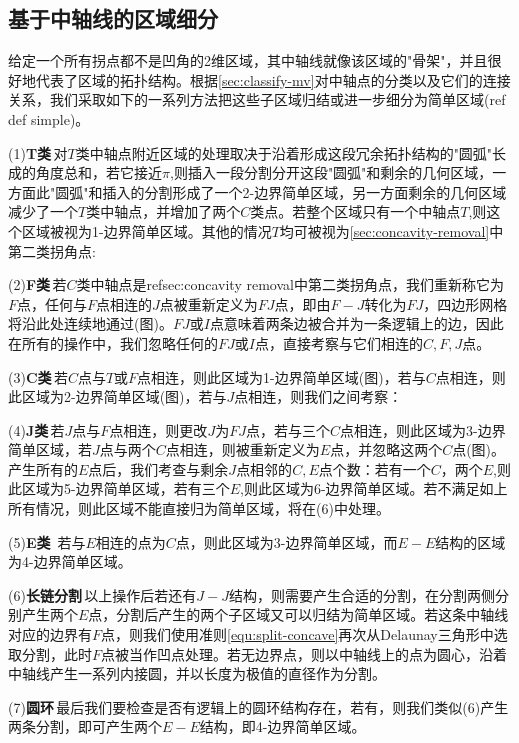 \subsection{基于中轴线的区域细分}\label{ma-prime}
给定一个所有拐点都不是凹角的2维区域，其中轴线就像该区域的"骨架"，并且很好地代表了区域的拓扑结构。根据\ref{sec:classify-mv}对中轴点的分类以及它们的连接关系，我们采取如下的一系列方法把这些子区域归结或进一步细分为简单区域(ref def simple)。

(1)\textbf{T类}\,对$T$类中轴点附近区域的处理取决于沿着形成这段冗余拓扑结构的"圆弧"长成的角度总和，若它接近$\pi$,则插入一段分割分开这段"圆弧"和剩余的几何区域，一方面此"圆弧"和插入的分割形成了一个2-边界简单区域，另一方面剩余的几何区域减少了一个$T$类中轴点，并增加了两个$C$类点。若整个区域只有一个中轴点$T$,则这个区域被视为1-边界简单区域。其他的情况$T$均可被视为\ref{sec:concavity-removal}中第二类拐角点:

(2)\textbf{F类}\,若$C$类中轴点是ref{sec:concavity removal}中第二类拐角点，我们重新称它为$F$点，任何与$F$点相连的$J$点被重新定义为$FJ$点，即由$F-J$转化为$FJ$，四边形网格将沿此处连续地通过(图)。$FJ$或$I$点意味着两条边被合并为一条逻辑上的边，因此在所有的操作中，我们忽略任何的$FJ$或$I$点，直接考察与它们相连的$C,F,J$点。

(3)\textbf{C类}\,若$C$点与$T$或$F$点相连，则此区域为1-边界简单区域(图)，若与$C$点相连，则此区域为2-边界简单区域(图)，若与$J$点相连，则我们之间考察：

(4)\textbf{J类}\,若$J$点与$F$点相连，则更改$J$为$FJ$点，若与三个$C$点相连，则此区域为3-边界简单区域，若$J$点与两个$C$点相连，则被重新定义为$E$点，并忽略这两个$C$点(图)。产生所有的$E$点后，我们考查与剩余$J$点相邻的$C,E$点个数：若有一个$C$，两个$E$,则此区域为5-边界简单区域，若有三个$E$,则此区域为6-边界简单区域。若不满足如上所有情况，则此区域不能直接归为简单区域，将在(6)中处理。

(5)\textbf{E类}\, 若与$E$相连的点为$C$点，则此区域为3-边界简单区域，而$E-E$结构的区域为4-边界简单区域。

(6)\textbf{长链分割}\,以上操作后若还有$J-J$结构，则需要产生合适的分割，在分割两侧分别产生两个$E$点，分割后产生的两个子区域又可以归结为简单区域。若这条中轴线对应的边界有$F$点，则我们使用准则\ref{equ:split-concave}再次从Delaunay三角形中选取分割，此时$F$点被当作凹点处理。若无边界点，则以中轴线上的点为圆心，沿着中轴线产生一系列内接圆，并以长度为极值的直径作为分割。

(7)\textbf{圆环}\,最后我们要检查是否有逻辑上的圆环结构存在，若有，则我们类似(6)产生两条分割，即可产生两个$E-E$结构，即4-边界简单区域。

